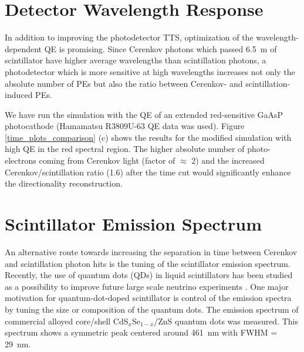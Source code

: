 \documentclass[aps,prc,twocolumn,groupedaddress,showpacs,amsmath,amssymb,floatfix,superscriptaddress]{revtex4}
\begin{document}
\section{Detector Wavelength Response}
\label{detector_wavelength_response_sec} 
In addition to improving the photodetector TTS, optimization of the
wavelength-dependent QE is promising. Since Cerenkov photons which
passed 6.5~m of scintillator have higher average wavelengths than
scintillation photons, a photodetector which is more sensitive at high
wavelengths increases not only the absolute number of PEs but also the
ratio between Cerenkov- and scintillation-induced PEs. 

We have run the simulation with the QE of an extended red-sensitive
GaAsP photocathode (Hamamatsu R3809U-63 QE data was used).  Figure
\ref{time_plots_comparison} (c) shows the results for the modified
simulation with high QE in the red spectral region. The higher
absolute number of photo-electrons coming from Cerenkov light (factor
of $\approx$ 2) and the increased Cerenkov/scintillation ratio (1.6)
after the time cut would significantly enhance the directionality
reconstruction.

\section{Scintillator Emission Spectrum}
\label{scintillator_emission_sec}
An alternative route towards increasing the separation in time between
Cerenkov and scintillation photon hits is the tuning of the
scintillator emission spectrum. Recently, the use of quantum dots
(QDs) in liquid scintillators has been studied as a possibility to
improve future large scale neutrino experiments \cite{qdot2}. One
major motivation for quantum-dot-doped scintillator is control of the
emission spectra by tuning the size or composition of the quantum
dots. The emission spectrum of commercial alloyed core/shell
CdS$_x$Se$_{1-x}$/ZnS quantum dots was measured. This spectrum shows a
symmetric peak centered around 461~nm with FWHM = 29~nm.
\end{document}
